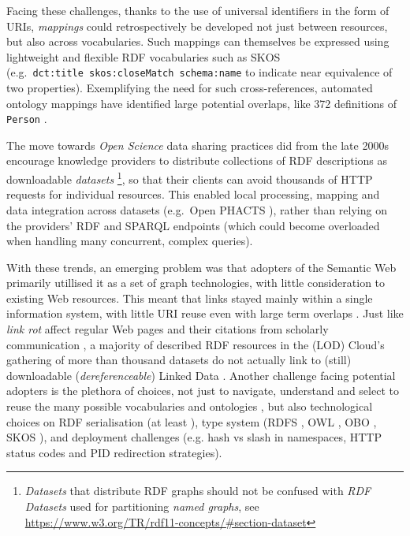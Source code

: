 Facing these challenges, thanks to the use of universal identifiers in the form of URIs, \emph{mappings} could retrospectively be developed not just between resources, but also across vocabularies. Such mappings can themselves be expressed using lightweight and flexible RDF vocabularies such as SKOS \cite{Isaac 2009} (e.g.~\texttt{dct:title\ skos:closeMatch\ schema:name} to indicate near equivalence of two properties). Exemplifying the need for such cross-references, automated ontology mappings have identified large potential overlaps, like 372 definitions of \texttt{Person} \cite{Hu 2011}.


The move towards \emph{Open Science} data sharing practices did from the late 2000s encourage knowledge providers to distribute collections of RDF descriptions as downloadable \emph{datasets} \footnote{\emph{Datasets} that distribute RDF graphs should not be confused with \emph{RDF Datasets} used for partitioning \emph{named graphs}, see \url{https://www.w3.org/TR/rdf11-concepts/\#section-dataset}}, so that their clients can avoid thousands of HTTP requests for individual resources\label{ch20:avoid-lots-of-requests}. This enabled local processing, mapping and data integration across datasets (e.g.~Open PHACTS \cite{Groth 2014}), rather than relying on the providers' RDF and SPARQL endpoints (which could become overloaded when handling many concurrent, complex queries).

With these trends, an emerging problem was that adopters of the Semantic Web primarily utillised it as a set of graph technologies, with little consideration to existing Web resources. This meant that links stayed mainly within a single information system, with little URI reuse even with large term overlaps \cite{Kamdar 2017}. Just like \emph{link rot} affect regular Web pages and their citations from scholarly communication \cite{Klein 2014}, a majority of described RDF resources in the  (LOD) Cloud's gathering of more than thousand datasets do not actually link to (still) downloadable (\emph{dereferenceable}) Linked Data \cite{Polleres 2020}. Another challenge facing potential adopters is the plethora of choices, not just to navigate, understand and select to reuse the many possible vocabularies and ontologies \cite{Carriero 2010}, but also technological choices on RDF serialisation (at least ), type system (RDFS \cite{Guha 2014}, OWL \cite{W3C 2012}, OBO \cite{Tirmizi 2011}, SKOS \cite{Isaac 2009}), and deployment challenges \cite{Sauermann 2008} (e.g. hash vs slash in namespaces, HTTP status codes and PID redirection strategies).

